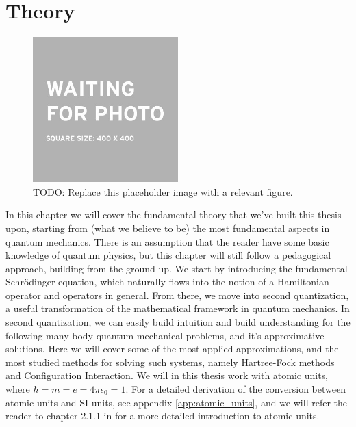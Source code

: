 \documentclass{subfiles}
\begin{document}
\chapter{Theory}
\begin{figure}
\centering
\includegraphics[width=0.5\textwidth]{figs/placeholder_image.jpeg}
\caption{TODO: Replace this placeholder image with a relevant figure. }
\label{fig:theory_intro}
\end{figure}
In this chapter we will cover the fundamental theory that we've built this thesis upon, starting from (what we believe to be) the most fundamental aspects in quantum mechanics.
There is an assumption that the reader have some basic knowledge of quantum physics, but this chapter will still follow a pedagogical approach, building from the ground up.
We start by introducing the fundamental Schrödinger equation, which naturally flows into the notion of a Hamiltonian operator and operators in general. From there, we move into 
second quantization, a useful transformation of the mathematical framework in quantum mechanics. In second quantization, we can easily build intuition and build understanding for
the following many-body quantum mechanical problems, and it's approximative solutions. Here we will cover some of the most applied approximations, and the most studied methods for solving
such systems, namely Hartree-Fock methods and Configuration Interaction. We will in this thesis work with atomic units, where $\hbar = m = e = 4\pi\epsilon_0 = 1$. For a detailed derivation of the conversion between atomic units and SI units, see appendix \ref{app:atomic_units}, and we will refer the reader to chapter 2.1.1 in \cite{szabo2012modern} for a more detailed introduction to atomic units.
\newpage





\end{document}
